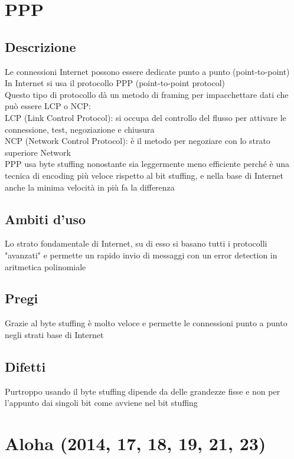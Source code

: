 \documentclass[10pt,oneside,a4paper]{article}
\begin{document}
\section{PPP}
\subsection{Descrizione}
Le connessioni Internet possono essere dedicate punto a punto (point-to-point)\\
In Internet si usa il protocollo PPP (point-to-point protocol)\\
Questo tipo di protocollo dà un metodo di framing per impacchettare dati che può essere LCP o NCP:\\
LCP (Link Control Protocol): si occupa del controllo del flusso per attivare le connessione, test, negoziazione e chiusura\\
NCP (Network Control Protocol): è il metodo per negoziare con lo strato superiore Network\\
PPP usa byte stuffing nonostante sia leggermente meno efficiente perché è una tecnica di encoding più veloce rispetto al bit stuffing, e nella base di Internet anche la minima velocità in più fa la differenza
\subsection{Ambiti d'uso}
Lo strato fondamentale di Internet, su di esso si basano tutti i protocolli "avanzati" e permette un rapido invio di messaggi con un error detection in aritmetica polinomiale
\subsection{Pregi}
Grazie al byte stuffing è molto veloce e permette le connessioni punto a punto negli strati base di Internet
\subsection{Difetti}
Purtroppo usando il byte stuffing dipende da delle grandezze fisse e non per l'appunto dai singoli bit come avviene nel bit stuffing
\section{Aloha (2014, 17, 18, 19, 21, 23)}
\end{document}
